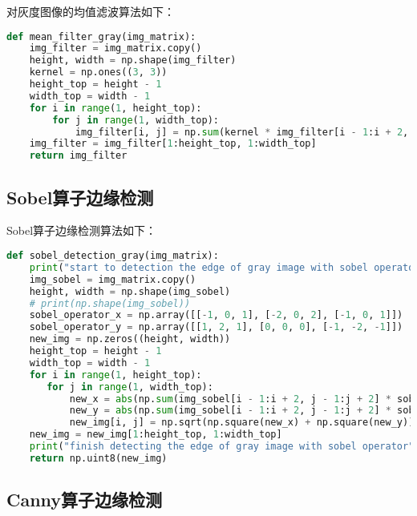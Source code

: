 \documentclass{hitreport}
\begin{document}
对灰度图像的均值滤波算法如下：
\begin{lstlisting}[language=python]
def mean_filter_gray(img_matrix):
    img_filter = img_matrix.copy()
    height, width = np.shape(img_filter)
    kernel = np.ones((3, 3))
    height_top = height - 1
    width_top = width - 1
    for i in range(1, height_top):
        for j in range(1, width_top):
            img_filter[i, j] = np.sum(kernel * img_filter[i - 1:i + 2, j - 1:j + 2]) // (3 ** 2)
    img_filter = img_filter[1:height_top, 1:width_top]
    return img_filter
\end{lstlisting}

\subsection{Sobel算子边缘检测}\label{sec:sobel}

Sobel算子边缘检测算法如下：
\begin{lstlisting}[language=python]
def sobel_detection_gray(img_matrix):
    print("start to detection the edge of gray image with sobel operator")
    img_sobel = img_matrix.copy()
    height, width = np.shape(img_sobel)
    # print(np.shape(img_sobel))
    sobel_operator_x = np.array([[-1, 0, 1], [-2, 0, 2], [-1, 0, 1]])
    sobel_operator_y = np.array([[1, 2, 1], [0, 0, 0], [-1, -2, -1]])
    new_img = np.zeros((height, width))
    height_top = height - 1
    width_top = width - 1
    for i in range(1, height_top):
       for j in range(1, width_top):
           new_x = abs(np.sum(img_sobel[i - 1:i + 2, j - 1:j + 2] * sobel_operator_x))
           new_y = abs(np.sum(img_sobel[i - 1:i + 2, j - 1:j + 2] * sobel_operator_y))
           new_img[i, j] = np.sqrt(np.square(new_x) + np.square(new_y))
    new_img = new_img[1:height_top, 1:width_top]
    print("finish detecting the edge of gray image with sobel operator")
    return np.uint8(new_img)
\end{lstlisting}

\subsection{Canny算子边缘检测}\label{sec:canny}
\end{document}

